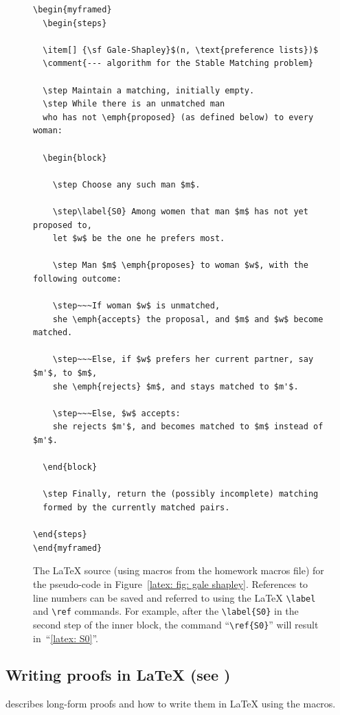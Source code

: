   
\begin{figure}
\begin{myframed}\small
\begin{verbatim}
\begin{myframed}
  \begin{steps}

  \item[] {\sf Gale-Shapley}$(n, \text{preference lists})$
  \comment{--- algorithm for the Stable Matching problem}

  \step Maintain a matching, initially empty.
  \step While there is an unmatched man 
  who has not \emph{proposed} (as defined below) to every woman:

  \begin{block}

    \step Choose any such man $m$.

    \step\label{S0} Among women that man $m$ has not yet proposed to, 
    let $w$ be the one he prefers most.

    \step Man $m$ \emph{proposes} to woman $w$, with the following outcome:

    \step~~~If woman $w$ is unmatched, 
    she \emph{accepts} the proposal, and $m$ and $w$ become matched.

    \step~~~Else, if $w$ prefers her current partner, say $m'$, to $m$, 
    she \emph{rejects} $m$, and stays matched to $m'$.

    \step~~~Else, $w$ accepts: 
    she rejects $m'$, and becomes matched to $m$ instead of $m'$.

  \end{block}

  \step Finally, return the (possibly incomplete) matching
  formed by the currently matched pairs.

\end{steps}
\end{myframed}
\end{verbatim}
\end{myframed}
  \caption{The LaTeX source (using macros from the homework macros file)
    for the pseudo-code in Figure~\ref{latex: fig: gale shapley}.
  References to line numbers can be saved and referred to
  using the LaTeX \texttt{\textbackslash label} and \texttt{\textbackslash ref} commands.
  For example, after the \texttt{\textbackslash label\{S0\}} in the second step of the inner block,
  the command ``\texttt{\textbackslash ref\{S0\}}'' will result in~``\ref{latex: S0}''.}\label{latex: fig: gale shapley source}
\end{figure}

\subsection{Writing proofs in LaTeX (see )}\label{latex: sec: latex proofs}
 describes long-form proofs and how to write them in LaTeX using the macros.


\newpage
